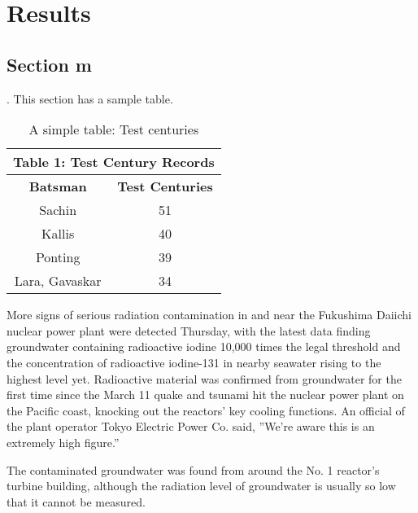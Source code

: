 %

\chapter{Results}
\section{Section m}.
This section has a sample table. 

\begin{table}[htbp]		%
\begin{center}		
\begin{tabular}{ | c | c | }	%
\hline
\multicolumn{2}{|c|}{Table 1: Test Century Records }\\
\hline
\bf{Batsman} & \bf{Test Centuries}\\ \hline
Sachin & 51 \\ \hline
Kallis & 40 \\ \hline
Ponting & 39 \\ \hline
Lara, Gavaskar & 34\\ 
\hline
\end{tabular}
\caption{A simple table: Test centuries}	%
\label{table1}
\end{center}
\end{table}
More signs of serious radiation contamination in and near the Fukushima Daiichi nuclear power plant were detected Thursday, with the latest data finding groundwater containing radioactive iodine 10,000 times the legal threshold and the concentration of radioactive iodine-131 in nearby seawater rising to the highest level yet.
\cite{INTERNET}
Radioactive material was confirmed from groundwater for the first time since the March 11 quake and tsunami hit the nuclear power plant on the Pacific coast, knocking out the reactors' key cooling functions. An official of the plant operator Tokyo Electric Power Co. said, ''We're aware this is an extremely high figure.''

The contaminated groundwater was found from around the No. 1 reactor's turbine building, although the radiation level of groundwater is usually so low that it cannot be measured.

